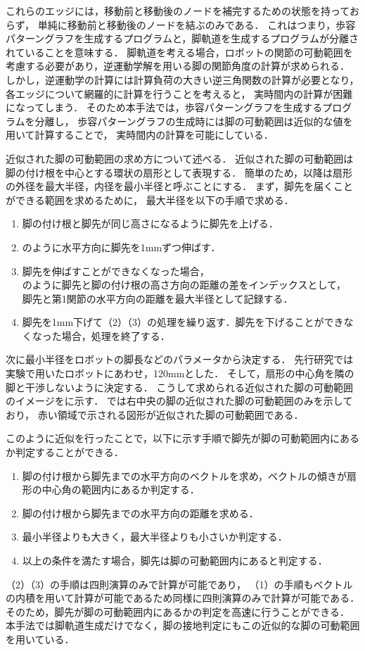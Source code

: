 これらのエッジには，移動前と移動後のノードを補完するための状態を持っておらず，
単純に移動前と移動後のノードを結ぶのみである．
これはつまり，歩容パターングラフを生成するプログラムと，脚軌道を生成するプログラムが分離されていることを意味する．
脚軌道を考える場合，ロボットの関節の可動範囲を考慮する必要があり，逆運動学解を用いる脚の関節角度の計算が求められる．
しかし，逆運動学の計算には計算負荷の大きい逆三角関数の計算が必要となり，各エッジについて網羅的に計算を行うことを考えると，
実時間内の計算が困難になってしまう．
そのため本手法では，歩容パターングラフを生成するプログラムを分離し，
歩容パターングラフの生成時には脚の可動範囲は近似的な値を用いて計算することで，
実時間内の計算を可能にしている．

近似された脚の可動範囲の求め方について述べる．
近似された脚の可動範囲は脚の付け根を中心とする環状の扇形として表現する．
簡単のため，以降は扇形の外径を最大半径，内径を最小半径と呼ぶことにする．
まず，脚先を届くことができる範囲を求めるために，
最大半径を以下の手順で求める．
\begin{enumerate}
  \item 脚の付け根と脚先が同じ高さになるように脚先を上げる．
  \item {}のように水平方向に脚先を1mmずつ伸ばす．
  \item 脚先を伸ばすことができなくなった場合，\\
        のように脚先と脚の付け根の高さ方向の距離の差をインデックスとして，\\
        脚先と第1関節の水平方向の距離を最大半径として記録する．
  \item 脚先を1mm下げて（2）（3）の処理を繰り返す．脚先を下げることができなくなった場合，処理を終了する．
\end{enumerate}
次に最小半径をロボットの脚長などのパラメータから決定する．
先行研究では実験で用いたロボットにあわせ，120mmとした．
そして，扇形の中心角を隣の脚と干渉しないように決定する．
こうして求められる近似された脚の可動範囲のイメージをに示す．
では右中央の脚の近似された脚の可動範囲のみを示しており，
赤い領域で示される図形が近似された脚の可動範囲である．

このように近似を行ったことで，以下に示す手順で脚先が脚の可動範囲内にあるか判定することができる．
\begin{enumerate}
  \item 脚の付け根から脚先までの水平方向のベクトルを求め，ベクトルの傾きが扇形の中心角の範囲内にあるか判定する．
  \item 脚の付け根から脚先までの水平方向の距離を求める．
  \item 最小半径よりも大きく，最大半径よりも小さいか判定する．
  \item 以上の条件を満たす場合，脚先は脚の可動範囲内にあると判定する．
\end{enumerate}
（2）（3）の手順は四則演算のみで計算が可能であり，
（1）の手順もベクトルの内積を用いて計算が可能であるため同様に四則演算のみで計算が可能である．
そのため，脚先が脚の可動範囲内にあるかの判定を高速に行うことができる．
本手法では脚軌道生成だけでなく，脚の接地判定にもこの近似的な脚の可動範囲を用いている．


